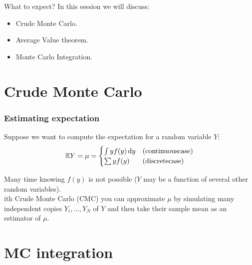\documentclass{beamer}
\begin{document}
\begin{frame}{What to expect?}
  In this session we will discuss:
  \begin{itemize}
    \item Crude Monte Carlo.
    \item Average Value theorem.
    \item Monte Carlo Integration.
  \end{itemize}
\end{frame}

\section{Crude Monte Carlo}

\begin{frame}
\frametitle{Estimating expectation}

Suppose we want to compute the expectation for a random variable $Y$:
\[
    \mathbb{E} Y = \mu = \begin{cases}
        \int y f(y) \mathop{}\!\mathrm{d} y & \mathrm{(continuous case)}\\
        \sum y f(y) & \mathrm{(discrete case)}
    \end{cases}
    \]

    Many time knowing $f(y)$ is not possible ($Y$ may be a function of several other random variables).
    \\[10pt]
    ith Crude Monte Carlo (CMC) you can approximate $\mu$ by simulating many independent copies $Y_i,\ldots,Y_N$ of $Y$ and then take their sample mean as an estimator of $\mu$.

\end{frame}

\section{MC integration}
\end{document}
